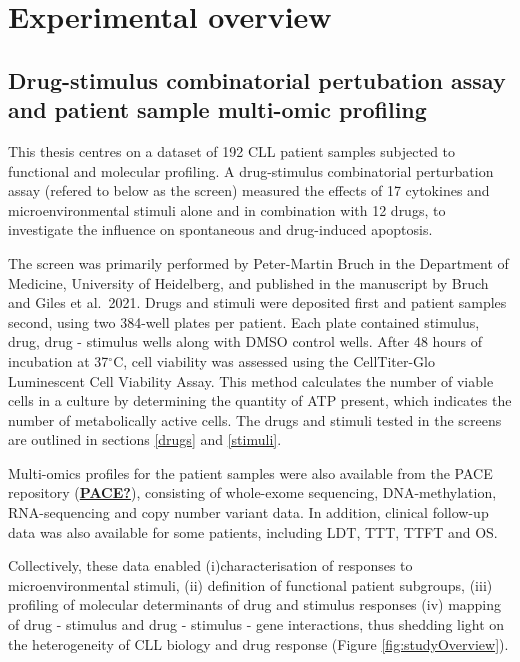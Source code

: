 \documentclass[11pt, a4paper, twosided]{book}
\begin{document}
\hypertarget{experimental-overview}{%
\section{Experimental overview}\label{experimental-overview}}

\hypertarget{drug-stimulus-combinatorial-pertubation-assay-and-patient-sample-multi-omic-profiling}{%
\subsection{Drug-stimulus combinatorial pertubation assay and patient sample multi-omic profiling}\label{drug-stimulus-combinatorial-pertubation-assay-and-patient-sample-multi-omic-profiling}}

This thesis centres on a dataset of 192 CLL patient samples subjected to functional and molecular profiling. A drug-stimulus combinatorial perturbation assay (refered to below as the screen) measured the effects of 17 cytokines and microenvironmental stimuli alone and in combination with 12 drugs, to investigate the influence on spontaneous and drug-induced apoptosis.

The screen was primarily performed by Peter-Martin Bruch in the Department of Medicine, University of Heidelberg, and published in the manuscript by Bruch and Giles et al.~2021. Drugs and stimuli were deposited first and patient samples second, using two 384-well plates per patient. Each plate contained stimulus, drug, drug - stimulus wells along with DMSO control wells. After 48 hours of incubation at 37\(^\circ\)C, cell viability was assessed using the CellTiter-Glo Luminescent Cell Viability Assay. This method calculates the number of viable cells in a culture by determining the quantity of ATP present, which indicates the number of metabolically active cells. The drugs and stimuli tested in the screens are outlined in sections \ref{drugs} and \ref{stimuli}.

Multi-omics profiles for the patient samples were also available from the PACE repository (\protect\hyperlink{ref-PACE}{\textbf{PACE?}}), consisting of whole-exome sequencing, DNA-methylation, RNA-sequencing and copy number variant data. In addition, clinical follow-up data was also available for some patients, including LDT, TTT, TTFT and OS.

Collectively, these data enabled (i)characterisation of responses to microenvironmental stimuli, (ii) definition of functional patient subgroups, (iii) profiling of molecular determinants of drug and stimulus responses (iv) mapping of drug - stimulus and drug - stimulus - gene interactions, thus shedding light on the heterogeneity of CLL biology and drug response (Figure \ref{fig:studyOverview}).
\end{document}
